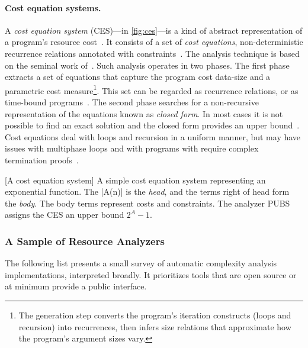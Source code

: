 \paragraph*{Cost equation systems.}
A \emph{cost equation system} (CES)---in \autoref{fig:ces}---is a kind of abstract representation of a program's resource cost~\cite{floresmontoya2017}.
It consists of a set of \emph{cost equations}, \ie non-deterministic recurrence relations annotated with constraints~\cite{floresmontoya2014}.
The analysis technique is based on the seminal work of~\textcite{wegbreit1975}.
Such analysis operates in two phases.
The first phase extracts a set of equations that capture the program cost \wrt data-size and a parametric cost measure\footnote{
The generation step converts the program's iteration constructs (loops and recursion) into recurrences,
then infers size relations that approximate how the program's argument sizes vary.}.
This set can be regarded as recurrence relations, or as time-bound programs~\cite{rosendahl1989}.
The second phase searches for a non-recursive representation of the equations known as \emph{closed form}.
In most cases it is not possible to find an exact solution and the closed form provides an upper bound~\cite{albert2008}.
Cost equations deal with loops and recursion in a uniform manner,
but may have issues with multiphase loops and with programs with require complex termination proofs~\cite{floresmontoya2014}.

\begin{center}
\begin{minipage}{\textwidth}
[A cost equation system]{
    A simple cost equation system representing an exponential function.
    The \pr|A(n)| is the \emph{head}, and the terms right of head form the \emph{body}.
    The body terms represent costs and constraints.
    The analyzer PUBS assigns the CES an upper bound \(2^A-1\).}
\label{fig:ces}
\end{minipage}
\end{center}

\subsubsection{A Sample of Resource Analyzers}
\label{resource-analysis-tools}

The following list presents a small survey of automatic complexity analysis implementations, interpreted broadly.
It prioritizes tools that are open source or at minimum provide a public interface.


